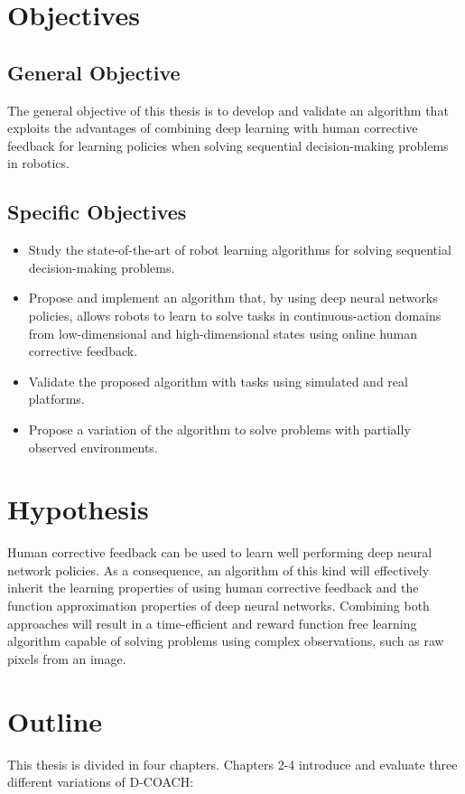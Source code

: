 \section{Objectives}
\subsection{General Objective}
The general objective of this thesis is to develop and validate an algorithm that exploits the advantages of combining deep learning with human corrective feedback for learning policies when solving sequential decision-making problems in robotics. 

\subsection{Specific Objectives}

\begin{itemize}
    \item Study the state-of-the-art of robot learning algorithms for solving sequential decision-making problems.
    \item Propose and implement an algorithm that, by using deep neural networks policies, allows robots to learn to solve tasks in continuous-action domains from low-dimensional and high-dimensional states using online human corrective feedback. 
    \item Validate the proposed algorithm with tasks using simulated and real platforms.
    \item Propose a variation of the algorithm to solve problems with partially observed environments.
\end{itemize}

\section{Hypothesis}
Human corrective feedback can be used to learn well performing deep neural network policies. As a consequence, an algorithm of this kind will effectively inherit the learning properties of using human corrective feedback and the function approximation properties of deep neural networks. Combining both approaches will result in a time-efficient and reward function free learning algorithm capable of solving problems using complex observations, such as raw pixels from an image.

\section{Outline}
This thesis is divided in four chapters. Chapters 2-4 introduce and evaluate three different variations of D-COACH:

